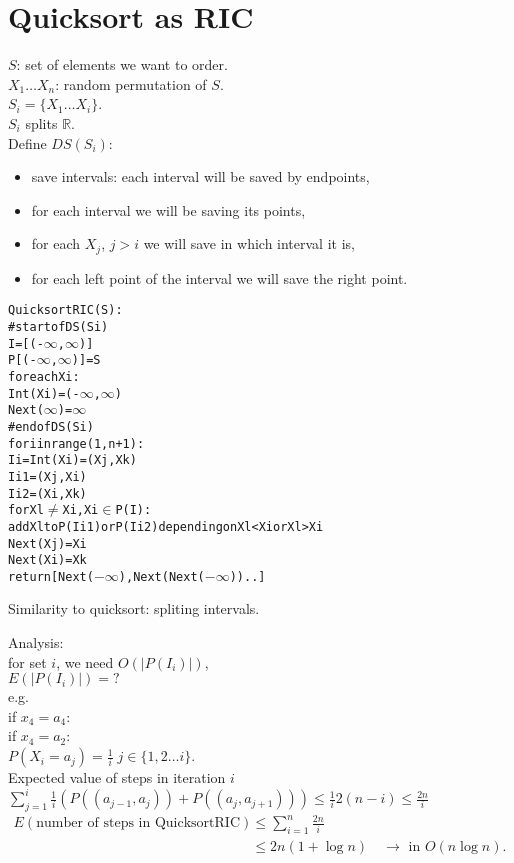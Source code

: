 \documentclass[a4paper, 12pt]{book}
\theoremstyle{definition}
\theoremstyle{remark}
\newcommand{\R}{\mathbb{R}}
\begin{document}
\section{Quicksort as RIC}

$S$: set of elements we want to order. \\
$X_1 \dots X_n$: random permutation of $S$. \\
$S_i = \{X_1 \dots X_i\}$. \\
$S_i$ splits $\R$. \\
Define $DS(S_i)$:
\begin{itemize}
  \item save intervals: each interval will be saved by endpoints,
  \item for each interval we will be saving its points,
  \item for each $X_j$, $j > i$ we will save in which interval it is,
  \item for each left point of the interval we will save the right point.
\end{itemize}
\begin{alltt}
  QuicksortRIC(S):
    # start of DS(Si)
    I=[(-\(\infty\),\(\infty\))]
    P[(-\(\infty\),\(\infty\))] = S
    for each Xi:
      Int(Xi) = (-\(\infty\),\(\infty\))
    Next(\(\infty\)) = \(\infty\)
    # end of DS(Si)
    for i in range(1,n+1):
      Ii = Int(Xi) = (Xj,Xk)
      Ii1 = (Xj,Xi)
      Ii2 = (Xi,Xk)
      for Xl \(\neq\) Xi, Xi \(\in\) P(I): 
        add Xl to P(Ii1) or P(Ii2) depending on Xl < Xi or Xl > Xi
      Next(Xj) = Xi
      Next(Xi) = Xk
    return [Next(\(-\infty\)), Next(Next(\(-\infty\))) ..]
\end{alltt}
Similarity to quicksort: spliting intervals.



Analysis: \\
for set $i$, we need $O\left(|P(I_i)|\right)$, \\
$E\left(|P(I_i)|\right) = ?$ \\
e.g. \\
if $x_4 = a_4$: \\
if $x_4 = a_2$: \\
$P(X_i = a_j) = \frac{1}{i} \; j \in \{1, 2 \dots i\}$. \\
Expected value of steps in iteration $i$ \\
$\sum_{j=1}^{i} \frac{1}{i} \left(P\left((a_{j-1},a_j)\right) + P\left((a_j,a_{j+1})\right)\right)
\leq \frac{1}{i} 2 (n-i) \leq \frac{2n}{i}$ \\
\begin{align*}
  E \left(\text{number of steps in QuicksortRIC}\right)
  &\leq \sum_{i=1}^{n} \frac{2n}{i} \\
  &\leq 2n (1 + \log n) \quad \to \text{ in } O(n \log n).
\end{align*}
\end{document}
